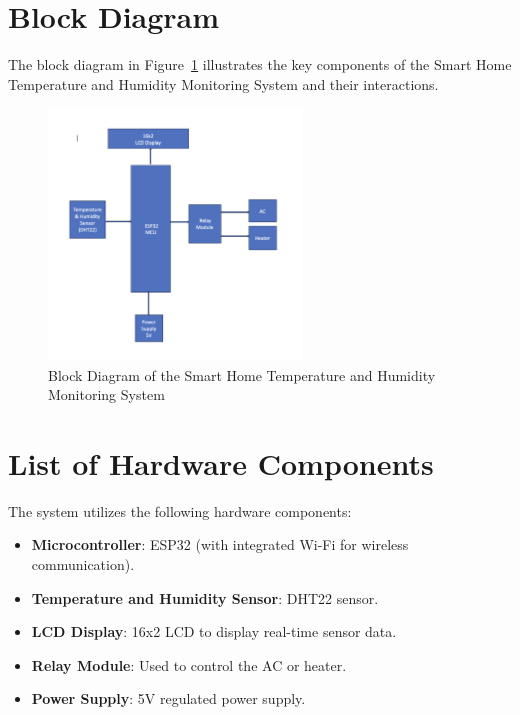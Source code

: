 \documentclass[a4paper,12pt]{article}
\begin{document}
\section{Block Diagram}
The block diagram in Figure~\ref{fig:blockdiagram} illustrates the key components of the Smart Home Temperature and Humidity Monitoring System and their interactions.

\begin{figure}[H]
    \centering
    \includegraphics[width=0.6\textwidth]{BlockDiagram.png} %
    \caption{Block Diagram of the Smart Home Temperature and Humidity Monitoring System}
    \label{fig:blockdiagram}
\end{figure}

\section{List of Hardware Components}
The system utilizes the following hardware components:
\begin{itemize}
    \item \textbf{Microcontroller}: ESP32 (with integrated Wi-Fi for wireless communication).
    \item \textbf{Temperature and Humidity Sensor}: DHT22 sensor.
    \item \textbf{LCD Display}: 16x2 LCD to display real-time sensor data.
    \item \textbf{Relay Module}: Used to control the AC or heater.
    \item \textbf{Power Supply}: 5V regulated power supply.
\end{itemize}
\end{document}
